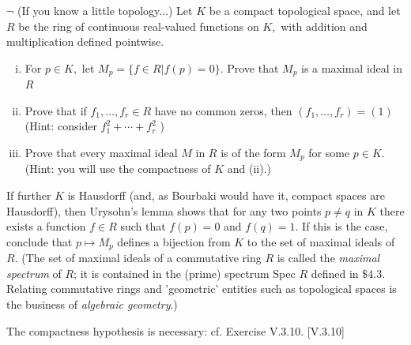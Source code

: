 \documentclass[12pt,letterpaper,boxed]{hmcpset}
\begin{document}
\begin{problem}[4.17]
	$\neg$ (If you know a little topology...) Let $K$ be a compact topological space, and let $R$ be the ring of continuous real-valued functions on $K,$ with addition and multiplication defined pointwise.
	\begin{enumerate}[(i)]
		\item For $p \in K,$ let $M_{p}=\{f \in R | f(p)=0\} .$ Prove that $M_{p}$ is a maximal ideal in $R$
		\item Prove that if $f_{1}, \ldots, f_{r} \in R$ have no common zeros, then $\left(f_{1}, \ldots, f_{r}\right)=(1)$ (Hint: consider $f_{1}^{2}+\cdots+f_{r}^{2}$ )
		\item Prove that every maximal ideal $M$ in $R$ is of the form $M_{p}$ for some $p \in K .$ (Hint:
		you will use the compactness of $K$ and (ii).) 
	\end{enumerate}
	If further $K$ is Hausdorff (and, as Bourbaki would have it, compact spaces are Hausdorff), then Urysohn's lemma shows that for any two points $p \neq q$ in $K$ there exists a function $f \in R$ such that $f(p)=0$ and $f(q)=1 .$ If this is the case, conclude that $p \mapsto M_{p}$ defines a bijection from $K$ to the set of maximal ideals of $R .$ (The set of maximal ideals of a commutative ring $R$ is called the \emph{maximal spectrum} of $R$; it is contained in the (prime) spectrum Spec $R$ defined in $\$ 4.3 .$ Relating commutative rings and 'geometric' entities such as topological spaces is the business of \emph{algebraic geometry}.)
	
	The compactness hypothesis is necessary: cf. Exercise V.3.10. [V.3.10]	
\end{problem}
\end{document}
